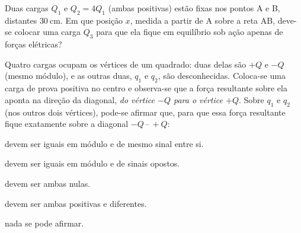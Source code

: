 \blocoaprofundamento
\begin{questao}[3]{}

Duas cargas $Q_1$ e $Q_2 = 4Q_1$ (ambas positivas) estão fixas nos pontos A e B,
distantes $\SI{30}{\centi\meter}$. Em que posição $x$, medida a partir de A sobre
a reta AB, deve-se colocar uma carga $Q_3$ para que ela fique em equilíbrio sob
ação apenas de forças elétricas?




\end{questao}
\begin{questao}[3]{}

Quatro cargas ocupam os vértices de um quadrado: duas delas são $+Q$ e $-Q$ (mesmo
módulo), e as outras duas, $q_1$ e $q_2$, são desconhecidas. Coloca-se uma carga
de prova positiva no centro e observa-se que a força resultante sobre ela aponta
na direção da diagonal, \emph{do vértice $-Q$ para o vértice $+Q$}. Sobre $q_1$ e
$q_2$ (nos outros dois vértices), pode-se afirmar que, para que essa força
resultante fique exatamente sobre a diagonal $-Q\,$--$\,+Q$:
\begin{alternativas}
\item devem ser iguais em módulo e de mesmo sinal entre si.
\item devem ser iguais em módulo e de sinais opostos.
\item devem ser ambas nulas.
\item devem ser ambas positivas e diferentes.
\item nada se pode afirmar.
\end{alternativas}


\end{questao}

